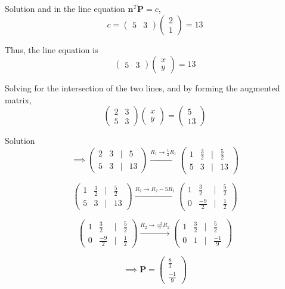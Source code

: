 \documentclass{beamer}
\let\vec\mathbf
\theoremstyle{remark}
\newcommand{\myvec}[1]{\ensuremath{\begin{pmatrix}#1\end{pmatrix}}}
\begin{document}
\begin{frame}{Solution}
and in the line equation $\vec{n}^T\vec{P}=c$,\\
\begin{equation}
    c = \myvec{5&3}\myvec{2\\1} = 13
\end{equation}

Thus, the line equation is\\
\begin{equation}
    \myvec{5&3}\myvec{x\\y} = 13
\end{equation}

Solving for the intersection of the two lines, and by forming the augmented matrix,\\
\begin{equation}
    \myvec{2&3\\5&3}\myvec{x\\y} = \myvec{5\\13}
\end{equation}
\end{frame}

\begin{frame}{Solution}
\begin{equation}
    \implies \myvec{2&3&|&5\\5&3&|&13} \overset{R_1 \rightarrow \frac{1}{2}R_1}{\longrightarrow} \myvec{1&\frac{3}{2}&|&\frac{5}{2}\\5&3&|&13}
\end{equation}

\begin{equation}
    \myvec{1&\frac{3}{2}&|&\frac{5}{2}\\5&3&|&13} \overset{R_2 \rightarrow R_2 - 5R_1}{\longrightarrow} \myvec{1&\frac{3}{2}&|&\frac{5}{2}\\0&\frac{-9}{2}&|&\frac{1}{2}}
\end{equation}

\begin{equation}
    \myvec{1&\frac{3}{2}&|&\frac{5}{2}\\0&\frac{-9}{2}&|&\frac{1}{2}} \overset{R_2 \rightarrow \frac{-2}{9}R_2}{\longrightarrow} \myvec{1&\frac{3}{2}&|&\frac{5}{2}\\0&1&|&\frac{-1}{9}} 
\end{equation}

\begin{equation}
    \implies \vec{P} = \myvec{\frac{8}{3}\\ \frac{-1}{9}}
\end{equation}

\end{frame}
\end{document}
